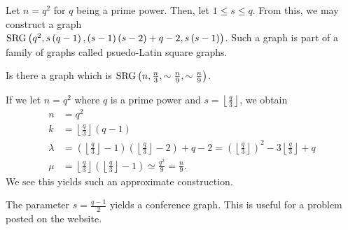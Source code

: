 \begin{recall}
	Let \(n=q^2\) for \(q\) being a prime power. Then, let \(1\le s \le q\). From this, we may  construct a graph \\\(\operatorname{SRG} \left( q^2, s\left( q-1 \right) , \left( s-1 \right) \left( s-2 \right) +q-2 , s\left( s-1 \right) \right) \). Such a graph is part of a family of graphs called psuedo-Latin square graphs.
\end{recall}
\begin{problem}
	Is there a graph which is \(\operatorname{SRG} \left( n, \frac{n}{3}, \sim\frac{n}{9}, \sim\frac{n}{9} \right) \).
\end{problem}
\begin{solution}
	If we let \(n=q^2\) where \(q\) is a prime power and \(s = \left\lfloor \frac{q}{3} \right\rfloor\), we obtain
	\begin{align*}
		n&=q^2\\
		k&= \left\lfloor \frac{q}{3} \right\rfloor\left( q-1 \right) \\
		\lambda &= \left( \left\lfloor \frac{q}{3} \right\rfloor -1 \right) \left( \left\lfloor \frac{q}{3} \right\rfloor-2 \right) +q - 2 = \left( \left\lfloor \frac{q}{3} \right\rfloor \right)^2 - 3\left\lfloor \frac{q}{3} \right\rfloor + q\\
		\mu &= \left\lfloor \frac{q}{3} \right\rfloor \left( \left\lfloor \frac{q}{3} \right\rfloor-1 \right) \simeq \frac{q^2}{9} = \frac{n}{9}
	.\end{align*}
We see this yields such an approximate construction.
\end{solution}
\begin{remark}
	The parameter \(s=\frac{q-1}{2}\) yields a conference graph. This is useful for a problem posted on the website.
\end{remark}
\newpage

